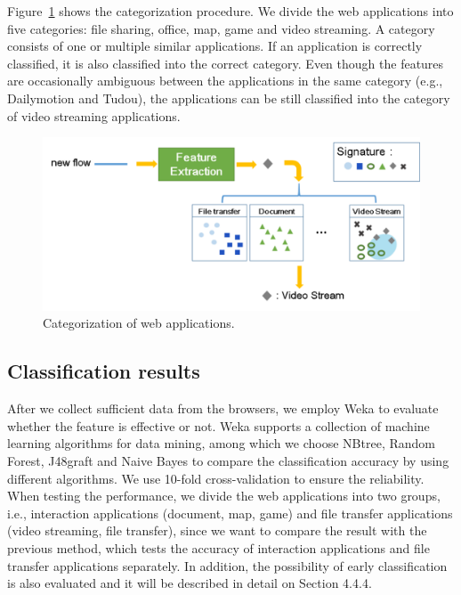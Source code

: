 \documentclass[preprint,12pt]{elsarticle}
\begin{document}
Figure~\ref{Fig.setlabel} shows the categorization procedure. We divide the web applications into five categories: file sharing, office, map, game and video streaming. A category consists of one or multiple similar applications. If an application is correctly classified, it is also classified into the correct category. Even though the features are occasionally ambiguous between the applications in the same category (e.g., Dailymotion and Tudou), the applications can be still classified into the category of video streaming applications.   

\begin{figure}[H]
\begin{center} 
\includegraphics[width=1.0\textwidth]{setlabel}
\end{center}
\caption{Categorization of web applications.}
\label{Fig.setlabel}
\end{figure}


\subsection{Classification results}
\label{sec:result}
After we collect sufficient data from the browsers, we employ Weka to evaluate whether the feature is effective or not. Weka supports a collection of machine learning algorithms for data mining, among which we choose NBtree, Random Forest, J48graft and Naive Bayes to compare the classification accuracy by using different algorithms. We use 10-fold cross-validation to ensure the reliability. When testing the performance, we divide the web applications into two groups, i.e., interaction applications (document, map, game) and file transfer applications (video streaming, file transfer), since we want to compare the result with the previous method, which tests the accuracy of interaction applications and file transfer applications separately. In addition, the possibility of early classification is also evaluated and it will be described in detail on Section 4.4.4.
\end{document}

